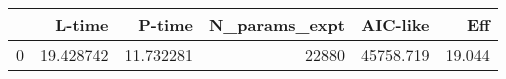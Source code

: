 \begin{tabular}{lrrrrr}
\toprule
{} &     L-time &     P-time &  N\_params\_expt &   AIC-like &     Eff \\
\midrule
0 &  19.428742 &  11.732281 &          22880 &  45758.719 &  19.044 \\
\bottomrule
\end{tabular}
